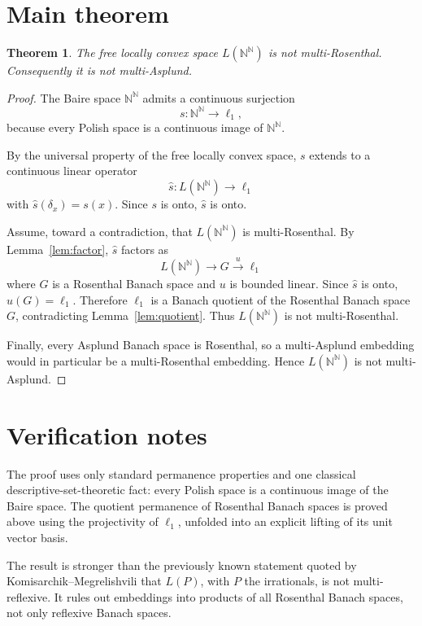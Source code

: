 \documentclass[11pt]{article}
\newtheorem{theorem}{Theorem}
\newcommand{\N}{\mathbb{N}}
\newcommand{\NN}{\N^\N}
\begin{document}
\section*{Main theorem}

\begin{theorem}
\label{thm:main}
The free locally convex space \(L(\mathbb N^{\mathbb N})\) is not
multi-Rosenthal.  Consequently it is not multi-Asplund.
\end{theorem}

\begin{proof}
The Baire space \(\NN\) admits a continuous surjection
\[
s:\NN\to\ell_1,
\]
because every Polish space is a continuous image of \(\NN\).

By the universal property of the free locally convex space, \(s\) extends to a
continuous linear operator
\[
\widehat{s}:L(\NN)\to\ell_1
\]
with \(\widehat{s}(\delta_x)=s(x)\).  Since \(s\) is onto, \(\widehat{s}\) is
onto.

Assume, toward a contradiction, that \(L(\NN)\) is multi-Rosenthal.  By
Lemma~\ref{lem:factor}, \(\widehat{s}\) factors as
\[
L(\NN)\longrightarrow G \stackrel{u}{\longrightarrow} \ell_1
\]
where \(G\) is a Rosenthal Banach space and \(u\) is bounded linear.  Since
\(\widehat{s}\) is onto, \(u(G)=\ell_1\).  Therefore \(\ell_1\) is a Banach
quotient of the Rosenthal Banach space \(G\), contradicting
Lemma~\ref{lem:quotient}.  Thus \(L(\NN)\) is not multi-Rosenthal.

Finally, every Asplund Banach space is Rosenthal, so a multi-Asplund embedding
would in particular be a multi-Rosenthal embedding.  Hence \(L(\NN)\) is not
multi-Asplund.
\end{proof}

\section*{Verification notes}

The proof uses only standard permanence properties and one classical
descriptive-set-theoretic fact: every Polish space is a continuous image of
the Baire space.  The quotient permanence of Rosenthal Banach spaces is proved
above using the projectivity of \(\ell_1\), unfolded into an explicit lifting
of its unit vector basis.

The result is stronger than the previously known statement quoted by
Komisarchik--Megrelishvili that \(L(P)\), with \(P\) the irrationals, is not
multi-reflexive.  It rules out embeddings into products of all Rosenthal
Banach spaces, not only reflexive Banach spaces.
\end{document}
